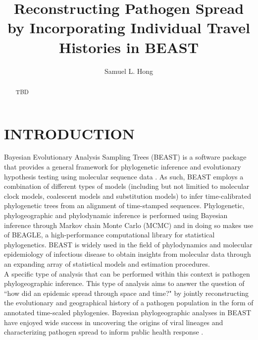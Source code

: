 \documentclass{article}
\title{Reconstructing Pathogen Spread by Incorporating Individual Travel Histories in BEAST}
\author{Samuel L. Hong}
\begin{document}
\maketitle

\begin{abstract}
\begin{adjustwidth}{0.5cm}{0.5cm}
TBD 
\end{adjustwidth}
\end{abstract}

\section*{INTRODUCTION}


Bayesian Evolutionary Analysis Sampling Trees (BEAST) \cite{beast110} is a software package that provides a general framework for phylogenetic inference and evolutionary hypothesis testing using molecular sequence data \cite{beastOG,beast17,beast110}.
As such, BEAST employs a combination of different types of models (including but not limitied to molecular clock models, coalescent models and substitution models) to infer time-calibrated phylogenetic trees from an alignment of time-stamped sequences.
Phylogenetic, phylogeographic and phylodynamic inference is performed using Bayesian inference through Markov chain Monte Carlo (MCMC) and in doing so makes use of BEAGLE, a high-performance computational library for statistical phylogenetics. %
BEAST is widely used in the field of phylodynamics and molecular epidemiology of infectious disease to obtain insights from molecular data through an expanding array of statistical models and estimation procedures. \\

A specific type of analysis that can be performed within this context is pathogen phylogeographic inference.
This type of analysis aims to answer the question of ``how did an epidemic spread through space and time?" by jointly reconstructing the evolutionary and geographical history of a pathogen population in the form of annotated time-scaled phylogenies.
Bayesian phylogeographic analyses in BEAST have enjoyed wide success in uncovering the origins of viral lineages \cite{hiv} and characterizing pathogen spread to inform public health response \cite{ebola}. \\
\end{document}
